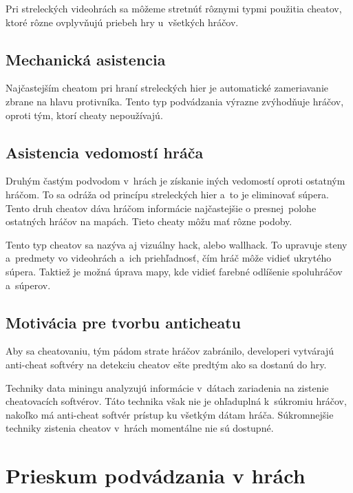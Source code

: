 \documentclass[10pt,twoside,slovak,a4paper]{article}
\begin{document}
Pri streleckých videohrách sa môžeme stretnúť rôznymi typmi použitia
cheatov, ktoré rôzne ovplyvňujú priebeh hry u~všetkých hráčov.

\hypertarget{mechanickuxe1-asistencia}{%
\subsection{Mechanická asistencia}\label{mechanickuxe1-asistencia}}

Najčastejším cheatom pri hraní streleckých hier je automatické
zameriavanie zbrane na hlavu protivníka. Tento typ podvádzania výrazne
zvýhodňuje hráčov, oproti tým, ktorí cheaty nepoužívajú.\cite{aim}

\hypertarget{asistencia-vedomostuxed-hruxe1ux10da}{%
\subsection{Asistencia vedomostí
hráča}\label{asistencia-vedomostuxed-hruxe1ux10da}}

Druhým častým podvodom v~hrách je získanie iných vedomostí oproti
ostatným hráčom. To sa odráža od princípu streleckých hier a~to je
eliminovať súpera. Tento druh cheatov dáva hráčom informácie
najčastejšie o presnej~polohe ostatných hráčov na mapách. Tieto cheaty
môžu mať rôzne podoby. 

Tento typ cheatov sa nazýva aj vizuálny hack,
alebo wallhack. To upravuje steny a~predmety vo videohrách a~ich
priehľadnosť, čím hráč môže vidieť ukrytého súpera. Taktiež je možná
úprava mapy, kde vidieť farebné odlíšenie spoluhráčov a~súperov.\cite{wallhack}

\hypertarget{asistencia-vedomostuxed-hruxe1ux10da}{%
\subsection{Motivácia pre tvorbu anticheatu}\label{asistencia-vedomostuxed-hruxe1ux10da}}
Aby sa cheatovaniu, tým pádom strate hráčov zabránilo, developeri
vytvárajú anti-cheat softvéry na detekciu cheatov ešte predtým ako sa
dostanú do hry.

Techniky data miningu analyzujú informácie v~dátach zariadenia na
zistenie cheatovacích softvérov. Táto technika však nie je ohľaduplná
k~súkromiu hráčov, nakoľko má anti-cheat softvér prístup ku všetkým
dátam hráča. Súkromnejšie techniky zistenia cheatov v~hrách momentálne
nie sú dostupné.
\newpage

\hypertarget{prieskum}{%
\section{\texorpdfstring{Prieskum podvádzania v hrách
}{Prieskum podvádzania v hrách}}\label{prieskum}}
\end{document}
